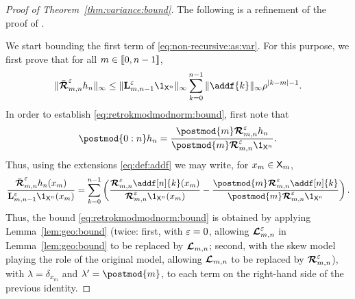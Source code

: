 \begin{proof}[Proof of Theorem~\ref{thm:variance:bound}]
The following is a refinement of the proof of \cite[Proposition~7]{olsson:westerborn:2017}. 

We start bounding the first term of \eqref{eq:non-recursive:as:var}. For this purpose, we first prove that for all $m \in \llbracket 0, n - 1 \rrbracket$, 
\begin{equation} \label{eq:retrokmodmodnorm:bound}
\|\retrokmodmodnorm_{m, n} h_n \|_\infty \leq \| \ukmod{m, n - 1} \1_{\Xset^n} \|_\infty \sum_{k = 0}^{n - 1} \|\addf{k} \|_\infty \rho^{|k - m| - 1}. 
\end{equation}
In order to establish \eqref{eq:retrokmodmodnorm:bound}, first note that  
\begin{equation} \label{eq:post:retrok:id}
\postmod{0:n} h_n = \frac{\postmod{m} \retrokmodmod_{m, n} h_n}{\postmod{m} \retrokmodmod_{m, n} \1_{\Xset^n}}.  
\end{equation}
Thus, using the extensions \eqref{eq:def:addf} we may write, for $x_m \in \mathsf{X}_m$, 
$$
\frac{\retrokmodmodnorm_{m, n} h_n(x_m)}{\ukmod{m, n - 1} \1_{\Xset^n}(x_m)} = \sum_{k = 0}^{n - 1} \left( \frac{\retrokmodmod_{m, n} \addf[n]{k}(x_m)}{\retrokmodmod_{m, n} \1_{\Xset^n}(x_m)} - \frac{\postmod{m} \retrokmodmod_{m, n} \addf[n]{k}}{\postmod{m} \retrokmodmod_{m, n} \1_{\Xset^n}} \right). 
$$
Thus, the bound \eqref{eq:retrokmodmodnorm:bound} is obtained by applying Lemma~\ref{lem:geo:bound} (twice: first, with $\varepsilon = 0$, allowing $\boldsymbol{\mathcal{L}}^\varepsilon_{m, n}$ in Lemma~\ref{lem:geo:bound} to be replaced by $\boldsymbol{\mathcal{L}}_{m, n}$; second, with the skew model playing the role of the original model, allowing $\boldsymbol{\mathcal{L}}_{m, n}$ to be replaced by $\boldsymbol{\mathcal{R}}^\varepsilon_{m, n}$), with $\lambda = \delta_{x_m}$ and $\lambda' = \postmod{m}$, to each term on the right-hand side of the previous identity. 


\end{proof}
